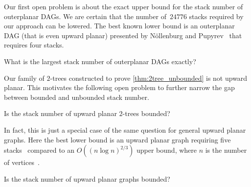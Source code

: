 \documentclass{theoretics}
\begin{document}
Our first open problem is about the exact upper bound for the stack number of outerplanar DAGs.
We are certain that the number of~$24776$ stacks required by our approach can be lowered.
The best known lower bound is an outerplanar DAG (that is even upward planar) presented by N\"{o}llenburg and Pupyrev~\cite{Noellenburg2021_DAGsWithConstantStackNumber} that requires four stacks.

\begin{open}
    What is the largest stack number of outerplanar DAGs exactly?
\end{open}

Our family of $2$-trees constructed to prove \cref{thm:2tree_unbounded} is not upward planar.
This motivates the following open problem to further narrow the gap between bounded and unbounded stack number.

\begin{open}
    Is the stack number of upward planar $2$-trees bounded?
\end{open}

In fact, this is just a special case of the same question for general upward planar graphs.
Here the best lower bound is an upward planar graph requiring five stacks~%
compared to an $O((n \log n)^{2/3})$ upper bound, where $n$ is the number of vertices~\cite{Jungeblut2022_SublinearUpperBound}.

\begin{open}
    Is the stack number of upward planar graphs bounded?
\end{open}

\printbibliography
\end{document}
